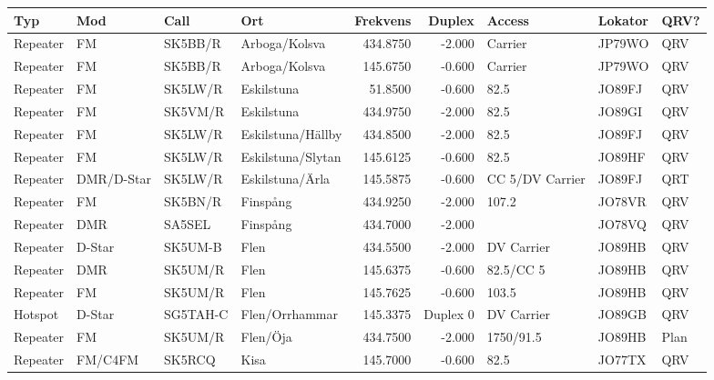 \begin{landscape}
\begin{longtable}{llllrrlll}
\bf Typ  & \bf Mod    & \bf Call & \bf Ort           & \bf Frekvens & \bf Duplex & \bf Access      & \bf Lokator & \bf QRV? \\ \hline \endhead
Repeater & FM         & SK5BB/R  & Arboga/Kolsva     & 434.8750     & -2.000     & Carrier         & JP79WO      & QRV      \\
Repeater & FM         & SK5BB/R  & Arboga/Kolsva     & 145.6750     & -0.600     & Carrier         & JP79WO      & QRV      \\
Repeater & FM         & SK5LW/R  & Eskilstuna        & 51.8500      & -0.600     & 82.5            & JO89FJ      & QRV      \\
Repeater & FM         & SK5VM/R  & Eskilstuna        & 434.9750     & -2.000     & 82.5            & JO89GI      & QRV      \\
Repeater & FM         & SK5LW/R  & Eskilstuna/Hällby & 434.8500     & -2.000     & 82.5            & JO89FJ      & QRV      \\
Repeater & FM         & SK5LW/R  & Eskilstuna/Slytan & 145.6125     & -0.600     & 82.5            & JO89HF      & QRV      \\
Repeater & DMR/D-Star & SK5LW/R  & Eskilstuna/Ärla   & 145.5875     & -0.600     & CC 5/DV Carrier & JO89FJ      & QRT      \\
Repeater & FM         & SK5BN/R  & Finspång          & 434.9250     & -2.000     & 107.2           & JO78VR      & QRV      \\
Repeater & DMR        & SA5SEL   & Finspång          & 434.7000     & -2.000     &                 & JO78VQ      & QRV      \\
Repeater & D-Star     & SK5UM-B  & Flen              & 434.5500     & -2.000     & DV Carrier      & JO89HB      & QRV      \\
Repeater & DMR        & SK5UM/R  & Flen              & 145.6375     & -0.600     & 82.5/CC 5       & JO89HB      & QRV      \\
Repeater & FM         & SK5UM/R  & Flen              & 145.7625     & -0.600     & 103.5           & JO89HB      & QRV      \\
Hotspot  & D-Star     & SG5TAH-C & Flen/Orrhammar    & 145.3375     & Duplex 0   & DV Carrier      & JO89GB      & QRV      \\
Repeater & FM         & SK5UM/R  & Flen/Öja          & 434.7500     & -2.000     & 1750/91.5       & JO89HB      & Plan     \\
Repeater & FM/C4FM    & SK5RCQ   & Kisa              & 145.7000     & -0.600     & 82.5            & JO77TX      & QRV      \\

\end{longtable}
\end{landscape}
